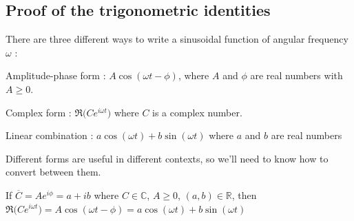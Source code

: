 \documentclass[11pt, openright]{book}
\begin{document}

\subsection{Proof of the trigonometric identities}

There are three different ways to write a sinusoidal function of angular frequency $\omega$ :
\begin{items}{-10pt}{-10pt}
    \item Amplitude-phase form : $A\cos(\omega t -\phi)$, where $A$ and $\phi$ are real numbers with $A\geq 0$.
    \item Complex form : $\Re\big(Ce^{i\omega t}\big)$ where $C$ is a complex number.
    \item Linear combination : $a\cos(\omega t)+b\sin(\omega t)$ where $a$ and $b$ are real numbers
\end{items}

Different forms are useful in different contexts, so we'll need to know how to convert between them.
\begin{dent}{}
    If $\overline{C}=Ae^{i\phi}=a+ib$ where $C\in\mathbb{C}$, $A\geq0$, $(a,b)\in\mathbb{R}$, then $\Re\big(Ce^{i\omega t}\big)=A\cos(\omega t-\phi)=a\cos(\omega t)+b\sin(\omega t)$
\end{dent}
\end{document}
